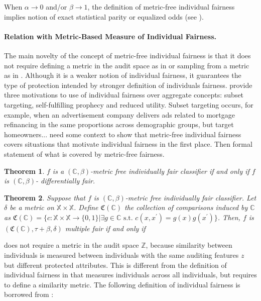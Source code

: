 \documentclass{article}
\newtheorem{thm}{Theorem}[section]
\begin{document}
When $\alpha \rightarrow 0$ and/or $\beta\rightarrow 1$, the definition of metric-free individual fairness implies notion of  exact statistical parity or equalized odds (see \cite{hardt2016equality}).

\paragraph{Relation with Metric-Based Measure of Individual Fairness.}
The main novelty of the concept of metric-free individual fairness is that it does not require defining a metric in the audit space as in \cite{dwork2012fairness} or sampling from a metric as in \cite{kim2018fairness}. Although it is a weaker notion of individual fairness, it guarantees the type of protection intended by stronger definition of individuals fairness. \cite{dwork2012fairness} provide three motivations to use of individual fairness over aggregate concepts: subset targeting,  self-fulfilling prophecy and reduced utility. Subset targeting occurs, for example, when an advertisement company delivers ads related to mortgage refinancing in the same proportions across demographic groups, but target homeowners... need some context to show that metric-free individual fairness covers situations that motivate individual fairness in the first place.  Then formal statement of what is covered by metric-free fairness.

\begin{thm}
\label{thm: df}
$f$ is a $(\mathbb{C}, \beta)$-metric free individually fair classifier if and only if $f$ is $(\mathbb{C}, \beta)$- differentially fair.
\end{thm}


\begin{thm}
\label{thm: mf}
Suppose that $f$ is $(\mathbb{C}, \beta)$-metric free individually fair classifier. Let $\delta$ be a metric on $\mathbb{X}\times \mathbb{X}$. Define $\mathfrak{C}(\mathbb{C})$ the collection of comparisons induced by $\mathbb{C}$ as $\mathfrak{C}(\mathbb{C})= \{c: \mathbb{X}\times \mathbb{X} \rightarrow \{0, 1\}| \exists g\in \mathbb{C} \mbox{ s.t. } c(x, x^{'})=g(x)g(x^{'})\}$. Then, $f$ is $(\mathfrak{C}(\mathbb{C}), \tau + \beta, \delta)$ multiple fair if and only if  
\end{thm}


does not require a metric in the audit space $\mathbb{Z}$, because similarity between individuals is measured between individuals with the same auditing features $z$ but different protected attributes. This is different from the definition of individual fairness in \cite{dwork2012fairness} that measures individuals across all individuals, but requires to define a similarity metric. The following definition of individual fairness is borrowed from \cite{dwork2012fairness}:
\end{document}

